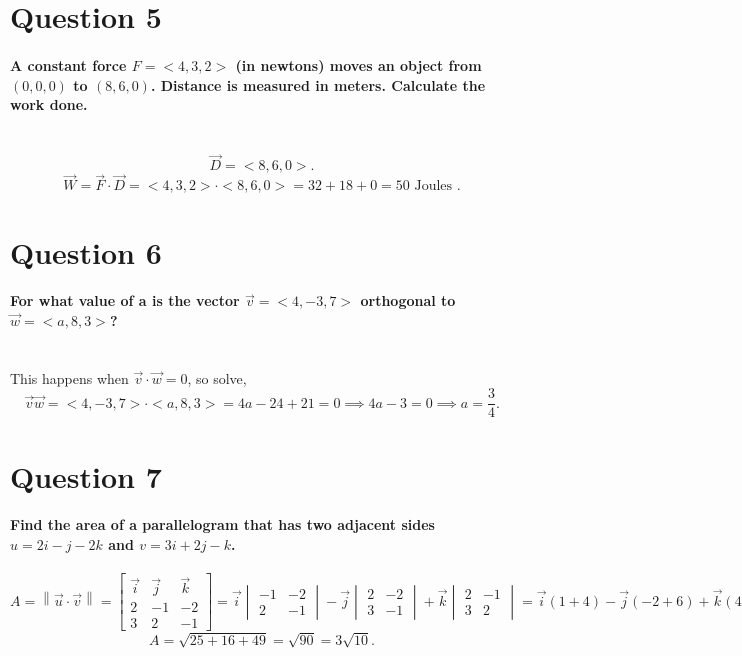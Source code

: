 \section{Question 5}%
\label{sec: Question 5 }
\paragraph{A constant force $ F= < 4,3,2> $ (in newtons) moves an object from $ \left( 0,0,0 \right) $ to $ \left( 8,6,0 \right) $. Distance is measured in meters. Calculate the work done. \\ \\}

\[
\vec{ D } = < 8,6,0 >
.\] 
\[
\vec{ W } = \vec{ F } \cdot \vec{ D } = < 4,3,2 > \cdot < 8,6,0 > = 32 + 18 + 0 = 50 \text{ Joules }
.\] 
\section{Question 6}%
\label{sec: Question 6 }
\paragraph{For what value of a is the vector $ \vec{ v } = <4,-3,7> $ orthogonal to $ \vec{ w } = <a,8,3> $? \\ \\}
This happens when $ \vec{ v } \cdot \vec{ w } = 0 $, so solve,
\[
\vec{ v }\vec{ w } = <4,-3,7> \cdot <a,8,3> = 4a - 24 + 21 = 0 \implies 4a - 3 = 0 \implies a = \frac{ 3 }{ 4 }
.\] 
\section{Question 7}%
\label{sec: Question 7 }
\paragraph{Find the area of  a parallelogram that has two adjacent sides $ u=2i- j-2k $ and $ v=3i+2j-k $.}
\[
	A = \left\| \vec{ u } \cdot \vec{ v } \right\| = \begin{bmatrix} \vec{ i } & \vec{ j } & \vec{ k }\\ 2 & -1 & -2 \\ 3 & 2 & -1 \end{bmatrix} = \vec{ i } \begin{vmatrix} -1 & -2 \\ 2 & -1 \end{vmatrix} - \vec{ j } \begin{vmatrix} 2 & -2 \\ 3 & -1 \end{vmatrix} + \vec{ k } \begin{vmatrix} 2 & -1 \\ 3 & 2 \end{vmatrix} = \vec{ i } (1+4) - \vec{ j } (-2+6) + \vec{ k } (4+3) = \left\| < -5,4,7 > \right\|
.\] 
\[
A = \sqrt{ 25 + 16 + 49 } = \sqrt{ 90 } = 3\sqrt{ 10 }
.\] 

